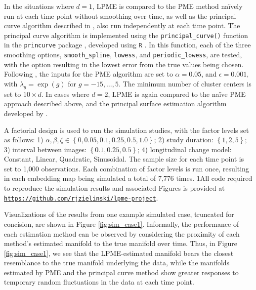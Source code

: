\documentclass[12pt]{article}
\newcommand{\blind}{1}
\theoremstyle{definition}
\begin{document}
In the situations where $d = 1$, LPME is compared to the PME method naïvely run at each time point without smoothing over time, as well as the principal curve algorithm described in \cite{hastie1989Principal}, also run independently at each time point. The principal curve algorithm is implemented using the \texttt{principal\_curve()} function in the \texttt{princurve} package \citep{Cannoodt2018princurve}, developed using \texttt{R} \citep{rSoftware2023}. In this function, each of the three smoothing options, \texttt{smooth\_spline}, \texttt{lowess}, and \texttt{periodic\_lowess}, are tested, with the option resulting in the lowest error from the true values being chosen. Following \cite{meng2021Principal}, the inputs for the PME algorithm are set to $\alpha = 0.05$, and $\epsilon = 0.001$, with $\lambda_g = \exp(g)$ for $g = -15, \dots, 5$. The minimum number of cluster centers is set to $10 \times d$. In cases where $d = 2$, LPME is again compared to the naïve PME approach described above, and the principal surface estimation algorithm developed by \cite{yue2016Parameterization}.

A factorial design is used to run the simulation studies, with the factor levels set as follows: 1) $\alpha, \beta, \zeta \in \left\{0, 0.05, 0.1, 0.25, 0.5, 1.0\right\}$; 2) study duration: $\left\{1, 2, 5\right\}$; 3) interval between images: $\left\{0.1, 0.25, 0.5\right\}$; 4) longitudinal change model: Constant, Linear, Quadratic, Sinusoidal. The sample size for each time point is set to 1,000 observations. Each combination of factor levels is run once, resulting in each embedding map being simulated a total of 7,776 times. \blind{All code required to reproduce the simulation results and associated Figures is provided at \href{https://github.com/rjzielinski/lpme-project}{\texttt{https://github.com/rjzielinski/lpme-project}}.}\fi {}

Visualizations of the results from one example simulated case, truncated for concision, are shown in Figure \ref{fig:sim_case1}. Informally, the performance of each estimation method can be observed by considering the proximity of each method's estimated manifold to the true manifold over time. Thus, in Figure \ref{fig:sim_case1}, we see that the LPME-estimated manifold bears the closest resemblance to the true manifold underlying the data, while the manifolds estimated by PME and the principal curve method show greater responses to temporary random fluctuations in the data at each time point.
\end{document}
